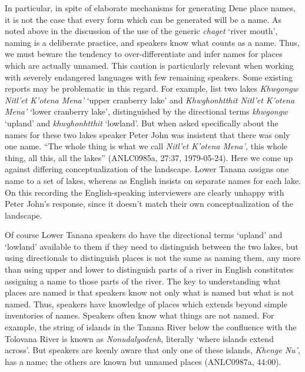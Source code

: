 In particular, in spite of elaborate mechanisms for generating Dene place names, it is not the case that every form which can be generated will be a name. As noted above in the discussion of the use of the generic \textit{chaget} ‘river mouth’, naming is a deliberate practice, and speakers know what counts as a name. Thus, we must beware the tendency to over-differentiate and infer names for places which are actually unnamed. This caution is particularly relevant when working with severely endangered languages with few remaining speakers. Some existing reports may be problematic in this regard. For example, \citet{kari2012} list two lakes \textit{Khwgongw Nitl’et K’otena Mena’}  ‘upper cranberry lake’ and \textit{Khwghonhtthit Nitl’et K’otena Mena’} ‘lower cranberry lake’, distinguished by the directional terms \textit{khwgongw} ‘upland’ and \textit{khwghonhtthit} ‘lowland’. But when asked specifically about the names for these two lakes speaker Peter John was insistent that there was only one name. “The whole thing is what we call \textit{Nitl’et K’otena Mena’,} this whole thing, all this, all the lakes” (ANLC0985a, 27:37, 1979-05-24). Here we come up against differing conceptualization of the landscape. Lower Tanana assigns one name to a set of lakes, whereas as English insists on separate names for each lake. On this recording the English-speaking interviewers are clearly unhappy with Peter John’s response, since it doesn’t match their own conceptualization of the landscape.

Of course Lower Tanana speakers do have the directional terms ‘upland’ and ‘lowland’ available to them if they need to distinguish between the two lakes, but using directionals to distinguish places is not the same as naming them, any more than using upper and lower to distinguish parts of a river in English constitutes assigning a name to those parts of the river.
The key to understanding what places are named is that speakers know not only what is named but what is not named. Thus, speakers have knowledge of places which extends beyond simple inventories of names. Speakers often know what things are not named. For example, the string of islands in the Tanana River below the confluence with the Tolovana River is known as \textit{Nonudalyodenh}, literally ‘where islands extend across’. But speakers are keenly aware that only one of these islands, \textit{Khenge Nu’}, has a name; the others are known but unnamed places (ANLC0987a, 44:00).

